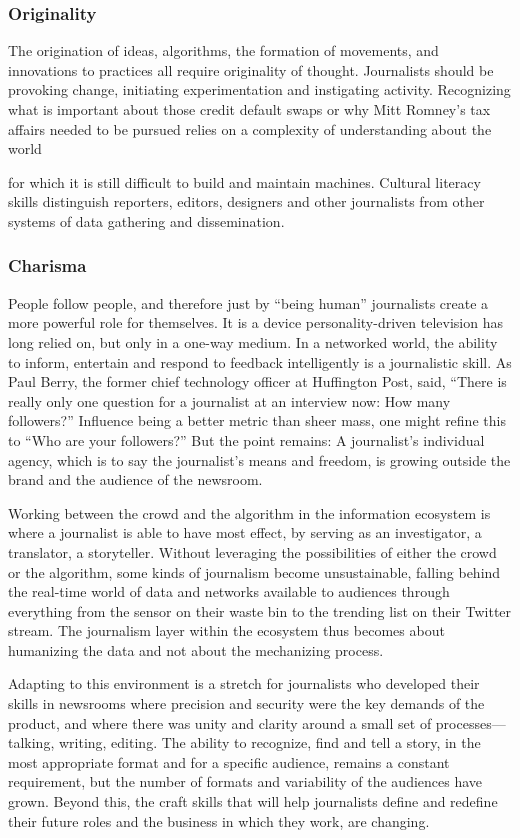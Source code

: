 \subsubsection{Originality}
The origination of ideas, algorithms, the formation of movements, and innovations
to practices all require originality of thought. Journalists should be provoking
change, initiating experimentation and instigating activity. Recognizing what
is important about those credit default swaps or why Mitt Romney’s tax affairs
needed to be pursued relies on a complexity of understanding about the world

for which it is still difficult to build and maintain machines. Cultural literacy skills
distinguish reporters, editors, designers and other journalists from other systems
of data gathering and dissemination.

\subsubsection{Charisma}

People follow people, and therefore just by ``being human'' journalists create a
more powerful role for themselves. It is a device personality-driven television has
long relied on, but only in a one-way medium. In a networked world, the ability
to inform, entertain and respond to feedback intelligently is a journalistic skill. As
Paul Berry, the former chief technology officer at Huffington Post, said, ``There
is really only one question for a journalist at an interview now: How many followers?''
Influence being a better metric than sheer mass, one might refine this
to ``Who are your followers?'' But the point remains: A journalist’s individual
agency, which is to say the journalist’s means and freedom, is growing outside the
brand and the audience of the newsroom.

Working between the crowd and the algorithm in the information ecosystem
is where a journalist is able to have most effect, by serving as an investigator, a
translator, a storyteller. Without leveraging the possibilities of either the crowd or
the algorithm, some kinds of journalism become unsustainable, falling behind the
real-time world of data and networks available to audiences through everything
from the sensor on their waste bin to the trending list on their Twitter stream.
The journalism layer within the ecosystem thus becomes about humanizing the
data and not about the mechanizing process.

Adapting to this environment is a stretch for journalists who developed their
skills in newsrooms where precision and security were the key demands of the
product, and where there was unity and clarity around a small set of processes—
talking, writing, editing. The ability to recognize, find and tell a story, in the most
appropriate format and for a specific audience, remains a constant requirement,
but the number of formats and variability of the audiences have grown. Beyond
this, the craft skills that will help journalists define and redefine their future roles
and the business in which they work, are changing.

